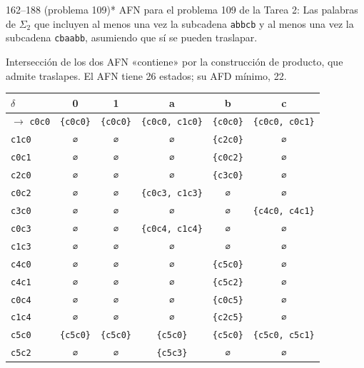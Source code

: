 \documentclass[11pt]{article}
\begin{document}
\begin{ejercicio}{162--188 (problema 109)}{*}
AFN para el problema 109 de la Tarea 2: Las palabras de $\Sigma_2$ que incluyen al menos una vez la subcadena \texttt{abbcb} y al menos una vez la subcadena \texttt{cbaabb}, asumiendo que sí se pueden traslapar.
\end{ejercicio}
\proc Intersección de los dos AFN «contiene» por la construcción de producto, que admite traslapes. El AFN tiene 26 estados; su AFD mínimo, 22.
\begin{center}\small\begin{tabular}{lccccc}\toprule
$\delta$ & 0 & 1 & a & b & c \\\midrule
$\to$ \texttt{c0c0} & \texttt{\{c0c0\}} & \texttt{\{c0c0\}} & \texttt{\{c0c0, c1c0\}} & \texttt{\{c0c0\}} & \texttt{\{c0c0, c0c1\}} \\
 \texttt{c1c0} & \texttt{∅} & \texttt{∅} & \texttt{∅} & \texttt{\{c2c0\}} & \texttt{∅} \\
 \texttt{c0c1} & \texttt{∅} & \texttt{∅} & \texttt{∅} & \texttt{\{c0c2\}} & \texttt{∅} \\
 \texttt{c2c0} & \texttt{∅} & \texttt{∅} & \texttt{∅} & \texttt{\{c3c0\}} & \texttt{∅} \\
 \texttt{c0c2} & \texttt{∅} & \texttt{∅} & \texttt{\{c0c3, c1c3\}} & \texttt{∅} & \texttt{∅} \\
 \texttt{c3c0} & \texttt{∅} & \texttt{∅} & \texttt{∅} & \texttt{∅} & \texttt{\{c4c0, c4c1\}} \\
 \texttt{c0c3} & \texttt{∅} & \texttt{∅} & \texttt{\{c0c4, c1c4\}} & \texttt{∅} & \texttt{∅} \\
 \texttt{c1c3} & \texttt{∅} & \texttt{∅} & \texttt{∅} & \texttt{∅} & \texttt{∅} \\
 \texttt{c4c0} & \texttt{∅} & \texttt{∅} & \texttt{∅} & \texttt{\{c5c0\}} & \texttt{∅} \\
 \texttt{c4c1} & \texttt{∅} & \texttt{∅} & \texttt{∅} & \texttt{\{c5c2\}} & \texttt{∅} \\
 \texttt{c0c4} & \texttt{∅} & \texttt{∅} & \texttt{∅} & \texttt{\{c0c5\}} & \texttt{∅} \\
 \texttt{c1c4} & \texttt{∅} & \texttt{∅} & \texttt{∅} & \texttt{\{c2c5\}} & \texttt{∅} \\
 \texttt{c5c0} & \texttt{\{c5c0\}} & \texttt{\{c5c0\}} & \texttt{\{c5c0\}} & \texttt{\{c5c0\}} & \texttt{\{c5c0, c5c1\}} \\
 \texttt{c5c2} & \texttt{∅} & \texttt{∅} & \texttt{\{c5c3\}} & \texttt{∅} & \texttt{∅} \\

\end{tabular}
\end{center}
\end{document}
